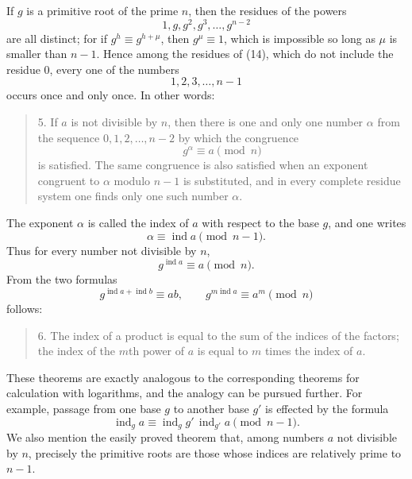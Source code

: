 \documentclass[11pt]{article}
\begin{document}
If $g$ is a primitive root of the prime $n$, then the residues of the powers
\[
\tag{14}       1,g,g^2,g^3,\ldots,g^{n-2}
\]
are all distinct; for if $g^h\equiv g^{h+\mu}$, then $g^\mu\equiv1$, which is impossible so long as $\mu$ is smaller than $n-1$. Hence among the residues of (14), which do not include the residue $0$, every one of the numbers
\[
\tag{15}       1,2,3,\ldots,n-1
\]
occurs once and only once. In other words:
\begin{quote}
5. If $a$ is not divisible by $n$, then there is one and only one number $\alpha$ from the sequence $0,1,2,\ldots,n-2$ by which the congruence
\[
\tag{16}       g^\alpha\equiv a\pmod n
\]
is satisfied. The same congruence is also satisfied when an exponent congruent to $\alpha$ modulo $n-1$ is substituted, and in every complete residue system one finds only one such number $\alpha$.
\end{quote}
The exponent $\alpha$ is called the index of $a$ with respect to the base $g$, and one writes
\[
\tag{17}       \alpha\equiv\operatorname{ind} a\pmod{n-1}.
\]
Thus for every number not divisible by $n$,
\[
\tag{18}       g^{\operatorname{ind}a}\equiv a\pmod n.
\]
From the two formulas
\[
\tag{19}       g^{\operatorname{ind}a+\operatorname{ind}b}\equiv ab,
        \qquad g^{m\operatorname{ind}a}\equiv a^m\pmod n
\]
follows:
\begin{quote}
6. The index of a product is equal to the sum of the indices of the factors; the index of the $m$th power of $a$ is equal to $m$ times the index of $a$.
\end{quote}
These theorems are exactly analogous to the corresponding theorems for calculation with logarithms, and the analogy can be pursued further. For example, passage from one base $g$ to another base $g'$ is effected by the formula
\[
\tag{20}       \operatorname{ind}_g a\equiv \operatorname{ind}_g g'\,\operatorname{ind}_{g'}a\pmod{n-1}.
\]
We also mention the easily proved theorem that, among numbers $a$ not divisible by $n$, precisely the primitive roots are those whose indices are relatively prime to $n-1$.
\end{document}
